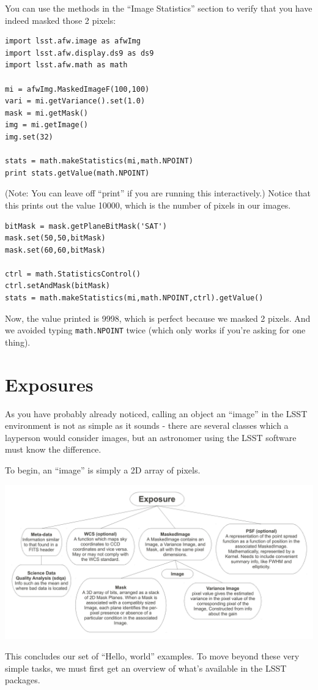 You can use the methods in the ``Image Statistics'' section to verify that you have indeed masked those 2 pixels:

\begin{verbatim}
import lsst.afw.image as afwImg
import lsst.afw.display.ds9 as ds9
import lsst.afw.math as math

mi = afwImg.MaskedImageF(100,100)
vari = mi.getVariance().set(1.0)
mask = mi.getMask()
img = mi.getImage()
img.set(32)

stats = math.makeStatistics(mi,math.NPOINT)
print stats.getValue(math.NPOINT)
\end{verbatim}

(Note: You can leave off ``print'' if you are running this interactively.)  Notice that this prints out the value 10000, which is the number of pixels in our images.

\begin{verbatim}
bitMask = mask.getPlaneBitMask('SAT')
mask.set(50,50,bitMask)
mask.set(60,60,bitMask)

ctrl = math.StatisticsControl()
ctrl.setAndMask(bitMask)
stats = math.makeStatistics(mi,math.NPOINT,ctrl).getValue()
\end{verbatim}

Now, the value printed is 9998, which is perfect because we masked 2 pixels.  And we avoided typing \verb|math.NPOINT| twice (which only works if you're asking for one thing).

\section{Exposures}
As you have probably already noticed, calling an object an ``image'' in the LSST environment is not as simple as it sounds - there are several classes which a layperson would consider images, but an astronomer using the LSST software must know the difference.

To begin, an ``image'' is simply a 2D array of pixels.

\includegraphics[angle=90,scale=0.5]{./figures/exposure.pdf}




\vskip0.5in

This concludes our set of ``Hello, world'' examples.  To move beyond
these very simple tasks, we must first get an overview of what's
available in the LSST packages.
